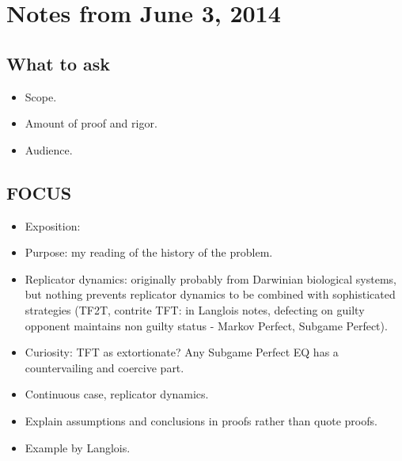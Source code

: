 
\section{Notes from June 3, 2014}

\subsection{What to ask}
\begin{itemize}
\item Scope.
\item Amount of proof and rigor.
\item Audience.
\end{itemize}

\subsection{FOCUS}
\begin{itemize}
\item Exposition:
\item Purpose: my reading of the history of the problem.
\item Replicator dynamics: originally probably from Darwinian biological systems, but nothing prevents replicator dynamics to be combined with sophisticated strategies (TF2T, contrite TFT: in Langlois notes, defecting on guilty opponent maintains non guilty status - Markov Perfect, Subgame Perfect).
\item Curiosity: TFT as extortionate? Any Subgame Perfect EQ has a countervailing and coercive part. 
\item Continuous case, replicator dynamics.
\item Explain assumptions and conclusions in proofs rather than quote proofs.
\item Example by Langlois.
\end{itemize}

